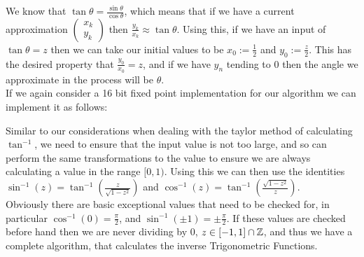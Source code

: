 {We know that \(\tan\theta = \frac{\sin\theta}{\cos\theta}\), which means that if we have a current approximation \(\left(\begin{array}{c}x_k\\y_k\end{array}\right)\) then \(\frac{y_k}{x_k} \approx \tan\theta\). Using this, if we have an input of \(\tan\theta = z\) then we can take our initial values to be \(x_0 := \tfrac{1}{2}\) and \(y_0 := \tfrac{z}{2}\). This has the desired property that \(\tfrac{y_0}{x_0} = z\), and if we have \(y_n\) tending to 0 then the angle we approximate in the process will be \(\theta\). \\

If we again consider a 16 bit fixed point implementation for our algorithm we can implement it as follows:


Similar to our considerations when dealing with the taylor method of calculating \(\tan^{-1}\), we need to ensure that the input value is not too large, and so can perform the same transformations to the value to ensure we are always calculating a value in the range \([0,1)\). Using this we can then use the identities \(\sin^{-1}(z) = \tan^{-1}(\frac{z}{\sqrt{1-z^2}})\) and \(\cos^{-1}(z) = \tan^{-1}(\frac{\sqrt{1 - z^2}}{z})\). \\

Obviously there are basic exceptional values that need to be checked for, in particular \(\cos^{-1}(0) = \tfrac{\pi}{2}\), and \(\sin^{-1}(\pm1) = \pm\tfrac{\pi}{2}\). If these values are checked before hand then we are never dividing by 0, \(z \in [-1,1]\cap\mathbb{Z}\), and thus we have a complete algorithm, that calculates the inverse Trigonometric Functions.\\

}
